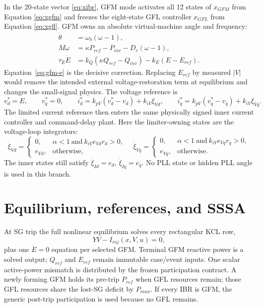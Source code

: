 \documentclass[12pt,a4paper]{article}
\begin{document}
In the 20-state vector \eqref{eq:xibr}, GFM mode activates all 12 states of $x_{GFM}$ from
Equation \eqref{eq:xgfm} and freezes the eight-state GFL controller $x_{GFL}$ from
Equation \eqref{eq:xgfl}. GFM owns an absolute virtual-machine angle and frequency:
\begin{align}
\dot\theta&=\omega_b(\omega-1),\\
M\dot\omega&=\kappa P_{ref}-P_{inv}-D_v(\omega-1),\\
\tau_E\dot E&=k_Q(\kappa Q_{ref}-Q_{inv})-k_E(E-E_{ref}).
\label{eq:gfm-e}
\end{align}
Equation~\eqref{eq:gfm-e} is the decisive correction. Replacing $E_{ref}$ by measured $|V|$
would remove the intended external voltage-restoration term at equilibrium and changes the
small-signal physics. The voltage reference is
\begin{equation}
v_d^*=E,\qquad v_q^*=0,\qquad
i_d^*=k_{pV}(v_d^*-v_d)+k_{iV}\xi_{Vd},\qquad
i_q^*=k_{pV}(v_q^*-v_q)+k_{iV}\xi_{Vq}.
\end{equation}
The limited current reference then enters the same physically signed inner current controller and
command-delay plant. Here the limiter-owning states are the voltage-loop integrators:
\begin{equation}
\dot\xi_{Vd}=\begin{cases}0,&\alpha<1\ \text{and}\ k_{iV}e_{Vd}r_d>0,\\e_{Vd},&\text{otherwise},\end{cases}
\quad
\dot\xi_{Vq}=\begin{cases}0,&\alpha<1\ \text{and}\ k_{iV}e_{Vq}r_q>0,\\e_{Vq},&\text{otherwise}.\end{cases}
\end{equation}
The inner states still satisfy $\dot\xi_{Id}=e_d$, $\dot\xi_{Iq}=e_q$. No PLL state or hidden
PLL angle is used in this branch.

\section{Equilibrium, references, and SSSA}

At SG trip the full nonlinear equilibrium solves every rectangular KCL row,
\begin{equation}
YV-I_{inj}(x,V,u)=0,
\end{equation}
plus one $\dot E=0$ equation per selected GFM. Terminal GFM reactive power is a solved output;
$Q_{ref}$ and $E_{ref}$ remain immutable case/event inputs. One scalar active-power mismatch is
distributed by the frozen participation contract. A newly forming GFM holds its pre-trip
$P_{ref}$ when GFL resources remain; those GFL resources share the lost-SG deficit by $P_{max}$.
If every IBR is GFM, the generic post-trip participation is used because no GFL remains.
\end{document}
